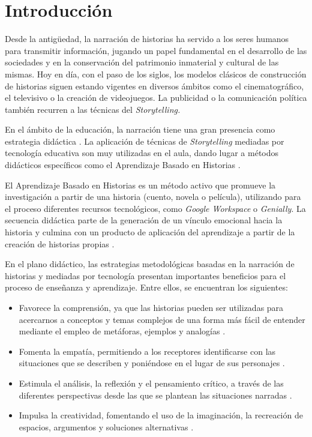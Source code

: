 \section{Introducción}\label{sec-introducción}

Desde la antigüedad, la narración de historias ha servido a los seres
humanos para transmitir información, jugando un papel fundamental en el
desarrollo de las sociedades y en la conservación del patrimonio
inmaterial y cultural de las mismas. Hoy en día, con el paso de los
siglos, los modelos clásicos de construcción de historias siguen estando
vigentes en diversos ámbitos como el cinematográfico, el televisivo o la
creación de videojuegos. La publicidad o la comunicación política
también recurren a las técnicas del \emph{Storytelling.}

En el ámbito de la educación, la narración tiene una gran presencia como
estrategia didáctica \cite{vergara_ramirez_narrar_2018}. La aplicación de técnicas de
\emph{Storytelling} mediadas por tecnología educativa son muy utilizadas
en el aula, dando lugar a métodos didácticos específicos como el
Aprendizaje Basado en Historias \cite{sanchez_rivas_experiencia_2023}.

El Aprendizaje Basado en Historias es un método activo que promueve la
investigación a partir de una historia (cuento, novela o película),
utilizando para el proceso diferentes recursos tecnológicos, como
\emph{Google Workspace} o \emph{Genially}. La secuencia didáctica parte
de la generación de un vínculo emocional hacia la historia y culmina con
un producto de aplicación del aprendizaje a partir de la creación de
historias propias \cite{sanchez-rivas_narrative-based_2022}.

En el plano didáctico, las estrategias metodológicas basadas en la
narración de historias y mediadas por tecnología presentan importantes
beneficios para el proceso de enseñanza y aprendizaje. Entre ellos, se
encuentran los siguientes:

\begin{itemize}
	\item
	Favorece la comprensión, ya que las historias pueden ser utilizadas
	para acercarnos a conceptos y temas complejos de una forma más fácil
	de entender mediante el empleo de metáforas, ejemplos y analogías
	\cite{isbell_effects_2004,lenhart_more_2020}.
	\item
	Fomenta la empatía, permitiendo a los receptores identificarse con las
	situaciones que se describen y poniéndose en el lugar de sus
	personajes \cite{bratitsis_digital_2016,skaraas_playing_2018,vaughan-lee_power_2019}.
	\item
	Estimula el análisis, la reflexión y el pensamiento crítico, a través
	de las diferentes perspectivas desde las que se plantean las
	situaciones narradas \cite{larry_crumbley_using_2000,young_introducing_1996}.
	\item
	Impulsa la creatividad, fomentando el uso de la imaginación, la
	recreación de espacios, argumentos y soluciones alternativas \cite{celume_fostering_2019,tabieh_effect_2021}.
\end{itemize}

